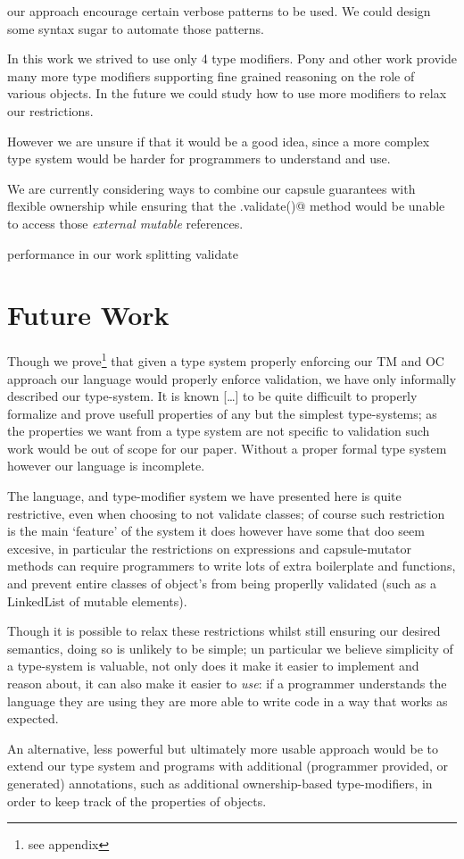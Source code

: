 our approach encourage certain verbose patterns to be used.
We could design some syntax sugar to automate those patterns.


In this work we strived to use only 4 type modifiers.
Pony and other work provide many more type modifiers supporting fine grained reasoning on the role of various objects.
In the future we could study how to use more modifiers to relax our restrictions.


However we are unsure if that it would be a good idea, since a more complex
type system would be harder for programmers to understand and use.


We are currently considering ways to combine our capsule guarantees with 
flexible ownership while ensuring that the \Q@.validate()@ method would be unable to access
those \emph{external mutable} references.



performance in our work splitting validate




\section{Future Work}
Though we prove\footnote{see appendix} that given a type system properly enforcing our TM and OC approach our language would properly enforce validation, we have only informally described our type-system. It is known […] to be quite difficuilt to properly formalize and prove usefull properties of any but the simplest type-systems; as the properties we want from a type system are not specific to validation such work would be out of scope for our paper. Without a proper formal type system however our language is incomplete.


The language, and type-modifier system we have presented here is quite restrictive, even when choosing to not validate classes; of course such restriction is the main ‘feature’ of the system it does however have some that doo seem excesive, in particular the restrictions on \@capsule@ expressions and capsule-mutator methods can require programmers to write lots of extra boilerplate and functions, and prevent entire classes of object’s from being properlly validated (such as a LinkedList of mutable elements).


Though it is possible to relax these restrictions whilst still ensuring our desired semantics, doing so is unlikely to be simple; un particular we believe simplicity of a type-system is valuable, not only does it make it easier to implement and reason about, it can also make it easier to \emph{use}: if a programmer understands the language they are using they are more able to write code in a way that works as expected.


An alternative, less powerful but ultimately more usable approach would be to extend our type system and programs with additional (programmer provided, or generated) annotations, such as additional ownership-based type-modifiers, in order to keep track of the properties of objects.